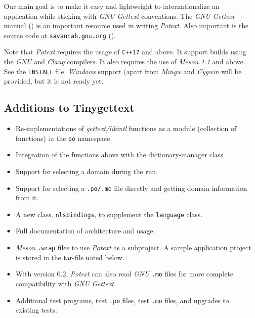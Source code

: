 \documentclass[
 11pt,
 twoside,
 a4paper,
 final                                 %
]{article}
\begin{document}
   Our main goal is to make it easy and lightweight to internationalize
   an application while sticking with \textsl{GNU Gettext}
   conventions.
   The \textsl{GNU Gettext} manual (\cite{gettextman}) is an important
   resource used in writing \textsl{Potext}.
   Also important is the source code at
   \texttt{savannah.gnu.org} (\cite{gettextcode}).

   Note that \textsl{Potext} requires the usage of \texttt{C++17}
   and above. It support builds using the \textsl{GNU} and \textsl{Clang}
   compilers.
   It also requires the use of \textsl{Meson 1.1} and above.
   See the \texttt{INSTALL} file.
   \textsl{Windows} support (apart from \textsl{Mingw} and
   \textsl{Cygwin} will be provided, but it is not ready yet.

\subsection{Additions to Tinygettext}
\label{subsec:introduction_additions}

   \begin{itemize}
      \item Re-implementations of \textsl{gettext/libintl}
         functions as a module
         (collection of functions) in the \texttt{po} namespace.
      \item Integration of the functions above with the
         dictionary-manager class.
      \item Support for selecting a domain during the run.
      \item Support for selecting a \texttt{.po/.mo} file directly
         and getting domain information from it.
      \item A new class, \texttt{nlsbindings}, to supplement the
         \texttt{language} class.
      \item Full documentation of architecture and usage.
      \item \textsl{Meson} \texttt{.wrap} files to use \textsl{Potext}
         as a subproject.
         A sample application project is stored in the tar-file noted
         below.
      \item With version 0.2, \textsl{Potext} can also read
         \textsl{GNU} \texttt{.mo} files for more complete
         compatibility with \textsl{GNU Gettext}.
      \item Additional test programs, test \texttt{.po} files,
         test \texttt{.mo} files, and upgrades to existing tests.
   \end{itemize}
\end{document}
